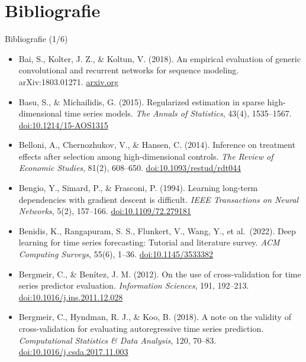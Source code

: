 \section{Bibliografie}

\begin{frame}{Bibliografie (1/6)}
\itemsize{\tiny}
\begin{itemize}
    \item Bai, S., Kolter, J. Z., \& Koltun, V. (2018). An empirical evaluation of generic convolutional and recurrent networks for sequence modeling. arXiv:1803.01271. \href{https://arxiv.org/abs/1803.01271}{arxiv.org}
    \item Basu, S., \& Michailidis, G. (2015). Regularized estimation in sparse high-dimensional time series models. \textit{The Annals of Statistics}, 43(4), 1535--1567. \href{https://doi.org/10.1214/15-AOS1315}{doi:10.1214/15-AOS1315}
    \item Belloni, A., Chernozhukov, V., \& Hansen, C. (2014). Inference on treatment effects after selection among high-dimensional controls. \textit{The Review of Economic Studies}, 81(2), 608--650. \href{https://doi.org/10.1093/restud/rdt044}{doi:10.1093/restud/rdt044}
    \item Bengio, Y., Simard, P., \& Frasconi, P. (1994). Learning long-term dependencies with gradient descent is difficult. \textit{IEEE Transactions on Neural Networks}, 5(2), 157--166. \href{https://doi.org/10.1109/72.279181}{doi:10.1109/72.279181}
    \item Benidis, K., Rangapuram, S. S., Flunkert, V., Wang, Y., et al.\ (2022). Deep learning for time series forecasting: Tutorial and literature survey. \textit{ACM Computing Surveys}, 55(6), 1--36. \href{https://doi.org/10.1145/3533382}{doi:10.1145/3533382}
    \item Bergmeir, C., \& Benítez, J. M. (2012). On the use of cross-validation for time series predictor evaluation. \textit{Information Sciences}, 191, 192--213. \href{https://doi.org/10.1016/j.ins.2011.12.028}{doi:10.1016/j.ins.2011.12.028}
    \item Bergmeir, C., Hyndman, R. J., \& Koo, B. (2018). A note on the validity of cross-validation for evaluating autoregressive time series prediction. \textit{Computational Statistics \& Data Analysis}, 120, 70--83. \href{https://doi.org/10.1016/j.csda.2017.11.003}{doi:10.1016/j.csda.2017.11.003}

\end{itemize}
\end{frame}
